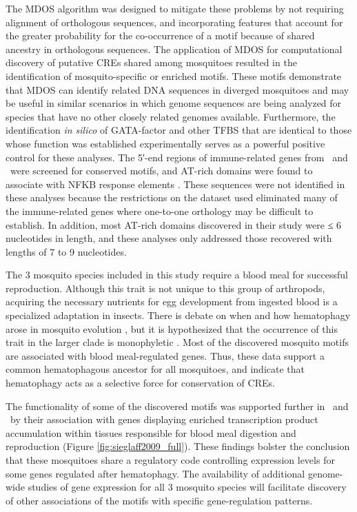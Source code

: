The \gls{MDOS} algorithm \cite{Wu2008} was designed to mitigate these problems by not requiring alignment of orthologous sequences, and incorporating features that account for the greater probability for the co-occurrence of a motif because of shared ancestry in orthologous sequences. The application of \gls{MDOS} for computational discovery of putative \glspl{CRE} shared among mosquitoes resulted in the identification of mosquito-specific or enriched motifs. These motifs demonstrate that \gls{MDOS} can identify related DNA sequences in diverged mosquitoes and may be useful in similar scenarios in which genome sequences are being analyzed for species that have no other closely related genomes available. Furthermore, the identification \textit{in silico} of GATA-factor and other \gls{TFBS} that are identical to those whose function was established experimentally \cite{Kokoza2001,Cho2006,Attardo2003,Ahmed1999,Pham2005,Giannoni2001,Dittmer2003,Meredith2006} serves as a powerful positive control for these analyses. The 5′-end regions of immune-related genes from \Ag\ and \Dm\ were screened for conserved motifs, and AT-rich domains were found to associate with \gls{NFKB} response elements \cite{Hernandez-Romano2008}. These sequences were not identified in these analyses because the restrictions on the dataset used eliminated many of the immune-related genes where one-to-one orthology may be difficult to establish. In addition, most AT-rich domains discovered in their study were ≤ 6 nucleotides in length, and these analyses only addressed those recovered with lengths of 7 to 9 nucleotides.

The 3 mosquito species included in this study require a blood meal for successful reproduction. Although this trait is not unique to this group of arthropods, acquiring the necessary nutrients for egg development from ingested blood is a specialized adaptation in insects. There is debate on when and how \gls{hematophagy} arose in mosquito evolution \cite{Rai1999a}, but it is hypothesized that the occurrence of this trait in the larger clade is \gls{monophyletic} \cite{Borkent2004,Calvo2006}. Most of the discovered mosquito motifs are associated with blood meal-regulated genes. Thus, these data support a common hematophagous ancestor for all mosquitoes, and indicate that \gls{hematophagy} acts as a selective force for conservation of \glspl{CRE}.

The functionality of some of the discovered motifs was supported further in \Ag\ and \Aa\ by their association with genes displaying enriched transcription product accumulation within tissues responsible for blood meal digestion and reproduction (Figure \ref{fig:sieglaff2009_full}). These findings bolster the conclusion that these mosquitoes share a regulatory code controlling expression levels for some genes regulated after \gls{hematophagy}. The availability of additional genome-wide studies of gene expression for all 3 mosquito species will facilitate discovery of other associations of the motifs with specific gene-regulation patterns.

